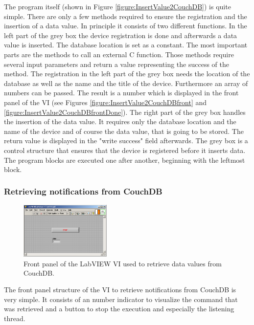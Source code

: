 The program itself (shown in Figure \ref{figure:InsertValue2CouchDB}) is quite simple. There are only a few methods required to ensure the registration and the insertion of a data value. In principle it consists of two different functions. In the left part of the grey box the device registration is done and afterwards a data value is inserted. The database location is set as a constant. The most important parts are the methods to call an external C function. Those methods require several input parameters and return a value representing the success of the method. The registration in the left part of the grey box needs the location of the database as well as the name and the title of the device. Furthermore an array of numbers can be passed. The result is a number which is displayed in the front panel of the VI (see Figures \ref{figure:InsertValue2CouchDBfront} and \ref{figure:InsertValue2CouchDBfrontDone}). The right part of the grey box handles the insertion of the data value. It requires only the database location and the name of the device and of course the data value, that is going to be stored. The return value is displayed in the "write success" field afterwards. The grey box is a control structure that ensures that the device is registered before it inserts data. The program blocks are executed one after another, beginning with the leftmost block.

\subsubsection{Retrieving notifications from CouchDB}
 
\begin{figure}[h!]
  \centering
      \includegraphics[width=0.4\textwidth]{images/CouchDB2LabVIEWFront.png}
  \caption{Front panel of the LabVIEW VI used to retrieve data values from CouchDB.}
  \label{figure:CouchDB2LabVIEWFront}
\end{figure}

The front panel structure of the VI to retrieve notifications from CouchDB is very simple. It consists of an number indicator to visualize the command that was retrieved and a button to stop the execution and especially the listening thread. 

